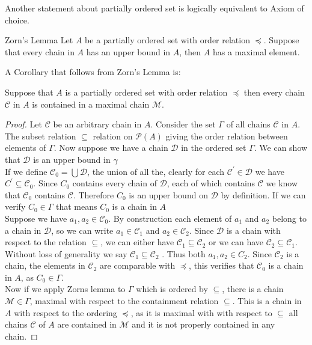 \documentclass[16pt,a4paper]{article}
\theoremstyle{definition}
\begin{document}
Another statement about partially ordered set is logically equivalent to Axiom of choice. 


\begin{thm}{Zorn's Lemma}{}
Let $A$ be a partially ordered set with order relation $\preceq$. Suppose that every chain in $A$ has an upper bound in $A$, then $A$ has a maximal element. 
\end{thm}


A Corollary that follows from Zorn's Lemma is:

\begin{coll}{}{}
Suppose that $A$ is a partially ordered set with order relation $\preceq$ then every chain $\mathcal{C}$ in $A$ is contained in a maximal chain $\mathcal{M}$. 
\end{coll}
\begin{proof}
Let $\mathcal{C}$ be an arbitrary chain in $A$. Consider the set $\Gamma$ of all chains $\mathcal{C}$ in $A$. The subset relation $\subseteq$ relation on $\mathcal{P}(A)$ giving the order relation between elements of $\Gamma$. Now suppose we have a chain $\mathcal{D}$ in the ordered set $\Gamma$. We can show that $\mathcal{D}$ is an upper bound in $\gamma$
\\

If we define $\mathcal{C}_0 = \bigcup \mathcal{D}$, the union of all the, clearly for each $\mathcal{C}^\prime \in \mathcal{D}$ we have $C^\prime \subseteq \mathcal{C}_0$. Since $C_0$ contains every chain of $\mathcal{D}$, each of which contains $\mathcal{C}$ we know that $\mathcal{C}_0$ contains $\mathcal{C}$. Therefore $C_0$ is an upper bound on $\mathcal{D}$ by definition. If we can verify $C_0 \in \Gamma $ that means $C_0$ is a chain in $A$
\\

Suppose we have  $a_1, a_2 \in \mathcal{C}_0$. By construction each element of $a_1$ and $a_2$ belong to a chain in $\mathcal{D}$, so we can write $a_1 \in \mathcal{C}_1$ and $a_2 \in \mathcal{C}_2$. Since $\mathcal{D}$ is a chain with respect to the relation $\subseteq$, we can either have $\mathcal{C}_1\subseteq \mathcal{C}_2$ or we can have $\mathcal{C}_2\subseteq \mathcal{C}_1$. Without loss of generality we say $\mathcal{C}_1\subseteq \mathcal{C}_2$ . Thus both $a_1, a_2 \in C_2$. Since $\mathcal{C}_2$ is a chain, the elements in $\mathcal{C}_2$ are comparable with $\preceq$, this verifies that $\mathcal{C}_0$ is a chain in $A$, as $C_0 \in \Gamma$. 
\\

Now if we apply Zorns lemma to $\Gamma$ which is ordered by $\subseteq$, there is a chain $\mathcal{M} \in \Gamma$, maximal with respect to the containment relation $\subseteq$. This is a chain in $A$ with respect to the ordering $\preceq$, as it is maximal with with respect to $\subseteq$ all chains $\mathcal{C}$ of $A$ are contained in $\mathcal{M}$ and it is not properly contained in any chain.  


\end{proof}
\end{document}
